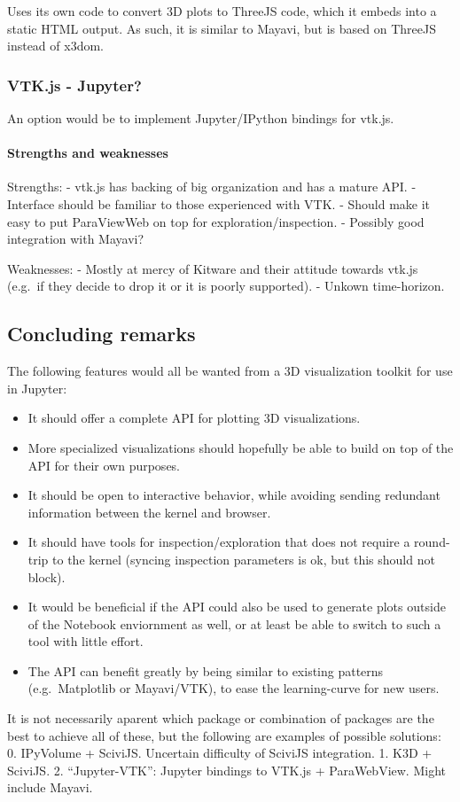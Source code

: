 Uses its own code to convert 3D plots to ThreeJS code, which it embeds
into a static HTML output. As such, it is similar to Mayavi, but is
based on ThreeJS instead of x3dom.

\subsubsection{VTK.js - Jupyter?}

An option would be to implement Jupyter/IPython bindings for vtk.js.

\paragraph{Strengths and weaknesses}

Strengths: - vtk.js has backing of big organization and has a mature
API. - Interface should be familiar to those experienced with VTK. -
Should make it easy to put ParaViewWeb on top for
exploration/inspection. - Possibly good integration with Mayavi?

Weaknesses: - Mostly at mercy of Kitware and their attitude towards
vtk.js (e.g.~if they decide to drop it or it is poorly supported). -
Unkown time-horizon.

\subsection{Concluding remarks}

The following features would all be wanted from a 3D visualization
toolkit for use in Jupyter:

\begin{itemize}
\tightlist
\item
  It should offer a complete API for plotting 3D visualizations.
\item
  More specialized visualizations should hopefully be able to build on
  top of the API for their own purposes.
\item
  It should be open to interactive behavior, while avoiding sending
  redundant information between the kernel and browser.
\item
  It should have tools for inspection/exploration that does not require
  a round-trip to the kernel (syncing inspection parameters is ok, but
  this should not block).
\item
  It would be beneficial if the API could also be used to generate plots
  outside of the Notebook enviornment as well, or at least be able to
  switch to such a tool with little effort.
\item
  The API can benefit greatly by being similar to existing patterns
  (e.g.~Matplotlib or Mayavi/VTK), to ease the learning-curve for new
  users.
\end{itemize}

It is not necessarily aparent which package or combination of packages
are the best to achieve all of these, but the following are examples of
possible solutions: 0. IPyVolume + SciviJS. Uncertain difficulty of
SciviJS integration. 1. K3D + SciviJS. 2. ``Jupyter-VTK'': Jupyter
bindings to VTK.js + ParaWebView. Might include Mayavi.
